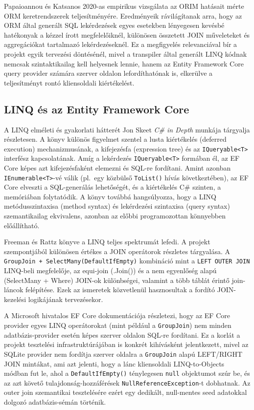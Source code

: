 \documentclass[a4paper,12pt]{article}
\begin{document}
Papaioannou és Katsanos \cite{papaioannou2020orim} 2020-as empirikus vizsgálata az ORIM hatásait mérte ORM keretrendszerek teljesítményére. Eredményeik rávilágítanak arra, hogy az ORM által generált SQL lekérdezések egyes esetekben lényegesen kevésbé hatékonyak a kézzel írott megfelelőiknél, különösen összetett JOIN műveleteket és aggregációkat tartalmazó lekérdezéseknél. Ez a megfigyelés relevanciával bír a projekt egyik tervezési döntésénél, mivel a transpiler által generált LINQ kódnak nemcsak szintaktikailag kell helyesnek lennie, hanem az Entity Framework Core query provider számára szerver oldalon lefordíthatónak is, elkerülve a teljesítményt rontó kliensoldali kiértékelést.

\subsection{LINQ és az Entity Framework Core}

A LINQ elméleti és gyakorlati hátterét Jon Skeet \textit{C\# in Depth} \cite{skeet2019csharp} munkája tárgyalja részletesen. A könyv különös figyelmet szentel a lusta kiértékelés (deferred execution) mechanizmusának, a kifejezésfa (expression tree) és az \texttt{IQueryable<T>} interfész kapcsolatának. Amíg a lekérdezés \texttt{IQueryable<T>} formában él, az EF Core képes azt kifejezésfaként elemezni és SQL-re fordítani. Amint azonban \texttt{IEnumerable<T>}-vé válik (pl.\ egy közbülső \texttt{ToList()} hívás következtében), az EF Core elveszti a SQL-generálás lehetőségét, és a kiértékelés C\# szinten, a memóriában folytatódik. A könyv továbbá hangsúlyozza, hogy a LINQ metódusszintaxisa (method syntax) és lekérdezési szintaxisa (query syntax) szemantikailag ekvivalens, azonban az előbbi programozottan könnyebben előállítható.

Freeman és Rattz \cite{freeman2010prolinq} könyve a LINQ teljes spektrumát lefedi. A projekt szempontjából különösen értékes a JOIN operátorok részletes tárgyalása. A \texttt{GroupJoin + SelectMany(DefaultIfEmpty)} kombináció mint a \texttt{LEFT OUTER JOIN} LINQ-beli megfelelője, az equi-join (.Join()) és a nem egyenlőség alapú (SelectMany + Where) JOIN-ok különbségei, valamint a több táblát érintő join-láncok felépítése. Ezek az ismeretek közvetlenül hasznosultak a fordító JOIN-kezelési logikájának tervezésekor.

A Microsoft hivatalos EF Core dokumentációja \cite{mslearn2023efcore} részletezi, hogy az EF Core provider egyes LINQ operátorokat (mint például a \texttt{GroupJoin}) nem minden adatbázis-provider esetén képes szerver oldalon SQL-re fordítani. Ez a korlát a projekt tesztelési infrastruktúrájában is konkrét kihívásként jelentkezett, mivel az SQLite provider nem fordítja szerver oldalra a \texttt{GroupJoin} alapú LEFT/RIGHT JOIN mintákat, ami azt jelenti, hogy a lánc kliensoldali LINQ-to-Objects módban fut le, ahol a \texttt{DefaultIfEmpty()} ténylegesen \texttt{null} objektumot szúr be, és az azt követő tulajdonság-hozzáférések \texttt{NullReferenceException}-t dobhatnak. Az outer join szemantikai tesztelésére ezért egy dedikált, null-mentes seed adatokkal dolgozó adatbázis-sémán történik.
\end{document}
